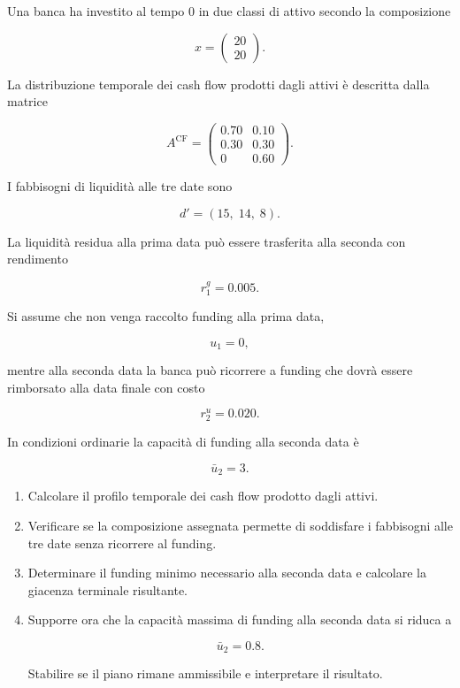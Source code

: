 \begin{exercise}

\label{ex:cap12-fattibilita-funding}

Una banca ha investito al tempo $0$ in due classi di attivo secondo la
composizione

\[
x=
\begin{pmatrix}
20\\
20
\end{pmatrix}.
\]

La distribuzione temporale dei cash flow prodotti dagli attivi \`e descritta
dalla matrice

\[
A^{\mathrm{CF}}
=
\begin{pmatrix}
0.70 & 0.10\\
0.30 & 0.30\\
0    & 0.60
\end{pmatrix}.
\]

I fabbisogni di liquidit\`a alle tre date sono

\[
d'
=
(15,\;14,\;8).
\]

La liquidit\`a residua alla prima data pu\`o essere trasferita alla seconda
con rendimento

\[
r_1^{g}=0.005.
\]

Si assume che non venga raccolto funding alla prima data,

\[
u_1=0,
\]

mentre alla seconda data la banca pu\`o ricorrere a funding che dovr\`a essere
rimborsato alla data finale con costo

\[
r_2^{u}=0.020.
\]

In condizioni ordinarie la capacit\`a di funding alla seconda data \`e

\[
\bar u_2=3.
\]

\begin{enumerate}

\item Calcolare il profilo temporale dei cash flow prodotto dagli attivi.

\item Verificare se la composizione assegnata permette di soddisfare i
fabbisogni alle tre date senza ricorrere al funding.

\item Determinare il funding minimo necessario alla seconda data e calcolare
la giacenza terminale risultante.

\item Supporre ora che la capacit\`a massima di funding alla seconda data si
riduca a

\[
\bar u_2=0.8.
\]

Stabilire se il piano rimane ammissibile e interpretare il risultato.

\end{enumerate}

\end{exercise}

